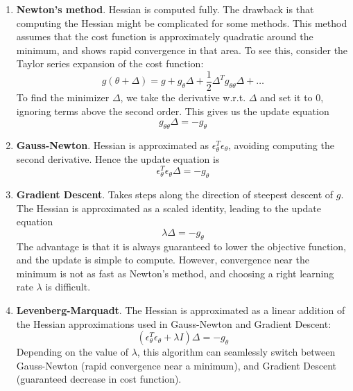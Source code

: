 \begin{enumerate}
\item \textbf{Newton's method}. Hessian is computed fully. The drawback is that computing the Hessian might be complicated for some methods. This method assumes that 
the cost function is approximately quadratic around the minimum, and shows rapid convergence in that area. To see this, consider the Taylor series expansion of the cost function:
\begin{equation}
g(\theta + \Delta) = g + g_\theta\Delta + \frac{1}{2}\Delta^T g_{\theta\theta}\Delta + \ldots
\end{equation}
To find the minimizer $\Delta$, we take the derivative w.r.t. $\Delta$ and set it to 0, ignoring terms above the second order. This gives us the update equation
\begin{equation}
g_{\theta\theta}\Delta = -g_\theta
\end{equation}

\item \textbf{Gauss-Newton}. Hessian is approximated as $\epsilon_\theta^T\epsilon_\theta$, avoiding computing the second derivative. Hence the update equation is
\begin{equation}
\epsilon_\theta^T\epsilon_\theta \Delta = -g_\theta
\end{equation}

\item \textbf{Gradient Descent}. Takes steps along the direction of steepest descent of $g$. The Hessian is approximated as a scaled identity, leading to the update equation
\begin{equation}
\lambda \Delta = -g_\theta
\end{equation}
The advantage is that it is always guaranteed to lower the objective function, and the update is simple to compute. However, convergence near the minimum is not as fast  as 
Newton's method, and choosing a right learning rate $\lambda$ is difficult.

\item \textbf{Levenberg-Marquadt}. The Hessian is approximated as a linear addition of the Hessian approximations used in Gauss-Newton and Gradient Descent:
\begin{equation}
(\epsilon_\theta^T\epsilon_\theta + \lambda I) \Delta = -g_\theta
\end{equation}
Depending on the value of $\lambda$, this algorithm can seamlessly switch between Gauss-Newton (rapid convergence near a minimum), and Gradient Descent (guaranteed
decrease in cost function).
\end{enumerate}
